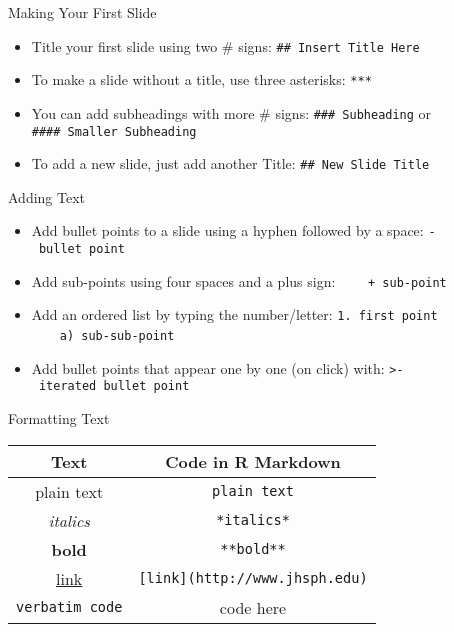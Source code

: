 \documentclass[
  ignorenonframetext,
]{beamer}
\providecommand{\tightlist}{%
  \setlength{\itemsep}{0pt}\setlength{\parskip}{0pt}}
\begin{document}
\begin{frame}[fragile]{Making Your First Slide}
\protect\hypertarget{making-your-first-slide}{}
\begin{itemize}
\tightlist
\item
  Title your first slide using two \# signs:
  \texttt{\#\#\ Insert\ Title\ Here}
\item
  To make a slide without a title, use three asterisks: \texttt{***}
\item
  You can add subheadings with more \# signs:
  \texttt{\#\#\#\ Subheading} or \texttt{\#\#\#\#\ Smaller\ Subheading}
\item
  To add a new slide, just add another Title:
  \texttt{\#\#\ New\ Slide\ Title}
\end{itemize}
\end{frame}

\begin{frame}[fragile]{Adding Text}
\protect\hypertarget{adding-text}{}
\begin{itemize}
\tightlist
\item
  Add bullet points to a slide using a hyphen followed by a space:
  \texttt{-\ bullet\ point}
\item
  Add sub-points using four spaces and a plus sign:
  ~~~~\texttt{+\ sub-point}
\item
  Add an ordered list by typing the number/letter:
  \texttt{1.\ first\ point} ~~~~\texttt{a)\ sub-sub-point}
\item
  Add bullet points that appear one by one (on click) with:
  \texttt{\textgreater{}-\ iterated\ bullet\ point}
\end{itemize}
\end{frame}

\begin{frame}[fragile]{Formatting Text}
\protect\hypertarget{formatting-text}{}
\begin{longtable}[]{@{}cc@{}}
\toprule
Text & Code in R Markdown \\
\midrule
\endhead
plain text & \texttt{plain\ text} \\
\emph{italics} & \texttt{*italics*} \\
\textbf{bold} & \texttt{**bold**} \\
\href{http://www.jhsph.edu}{link} &
\texttt{{[}link{]}(http://www.jhsph.edu)} \\
\texttt{verbatim\ code} & code here \\
\bottomrule
\end{longtable}
\end{frame}
\end{document}
